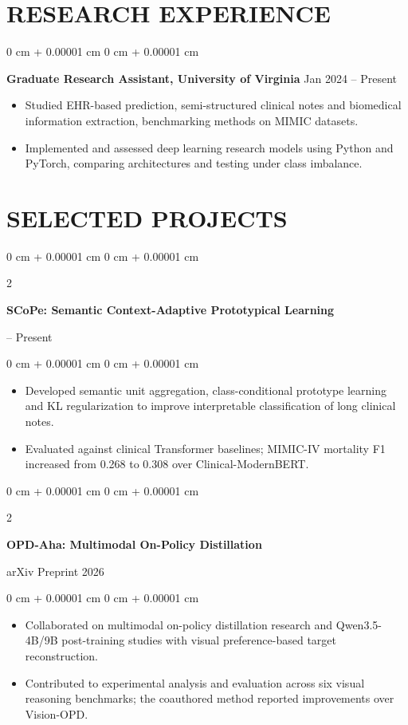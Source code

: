 \documentclass[10pt, letterpaper]{article}
\newenvironment{highlights}{
    \begin{itemize}[
        topsep=0.03 cm,
        parsep=0.03 cm,
        partopsep=0pt,
        itemsep=0pt,
        leftmargin=0 cm + 10pt
    ]
}{
    \end{itemize}
} %
\newenvironment{onecolentry}{
    \begin{adjustwidth}{
        0 cm + 0.00001 cm
    }{
        0 cm + 0.00001 cm
    }
}{
    \end{adjustwidth}
} %
\newenvironment{twocolentry}[2][]{
    \onecolentry
    \def\secondColumn{#2}
    \setcolumnwidth{\fill, 4.5 cm}
    \begin{paracol}{2}
}{
    \switchcolumn \raggedleft \secondColumn
    \end{paracol}
    \endonecolentry
} %
\begin{document}
\section{RESEARCH EXPERIENCE}
\begin{onecolentry}
\textbf{Graduate Research Assistant, University of Virginia} \hfill Jan 2024 -- Present
\begin{highlights}
\item Studied EHR-based prediction, semi-structured clinical notes and biomedical information extraction, benchmarking methods on MIMIC datasets.
\item Implemented and assessed deep learning research models using Python and PyTorch, comparing architectures and testing under class imbalance.
\end{highlights}
\end{onecolentry}
\section{SELECTED PROJECTS}
\begin{twocolentry}{2026 -- Present}
\textbf{SCoPe: Semantic Context-Adaptive Prototypical Learning}
\end{twocolentry}
\begin{onecolentry}
\begin{highlights}
\item Developed semantic unit aggregation, class-conditional prototype learning and KL regularization to improve interpretable classification of long clinical notes.
\item Evaluated against clinical Transformer baselines; MIMIC-IV mortality F1 increased from 0.268 to 0.308 over Clinical-ModernBERT.
\end{highlights}
\end{onecolentry}
\vspace{0.035 cm}

\begin{twocolentry}{arXiv Preprint 2026}
\textbf{OPD-Aha: Multimodal On-Policy Distillation}
\end{twocolentry}
\begin{onecolentry}
\begin{highlights}
\item Collaborated on multimodal on-policy distillation research and Qwen3.5-4B/9B post-training studies with visual preference-based target reconstruction.
\item Contributed to experimental analysis and evaluation across six visual reasoning benchmarks; the coauthored method reported improvements over Vision-OPD.
\end{highlights}
\end{onecolentry}
\vspace{0.035 cm}
\end{document}
